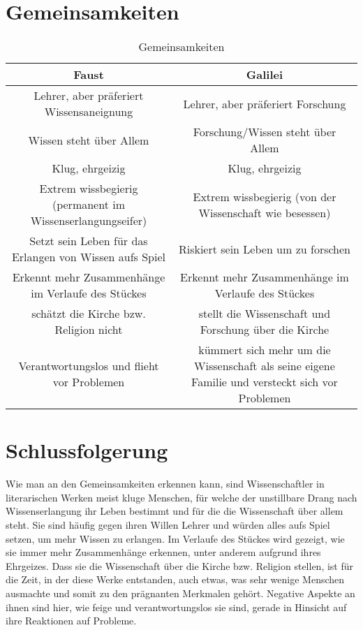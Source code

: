 \documentclass[12pt]{scrreprt}
\begin{document}
\section{Gemeinsamkeiten}
	\label{sec:gemeinsamkeiten}
	\begin{table}[!htb]
		\centering
		\caption[Gemeinsamkeiten]{Gemeinsamkeiten\footnotemark}
		\begin{tabulary}{\textwidth}{|C|C|}
			\hline
			\textbf{Faust} & \textbf{Galilei} \\
			\hline
			Lehrer, aber präferiert Wissensaneignung & Lehrer, aber präferiert Forschung \\
			\hline
			Wissen steht über Allem & Forschung/Wissen steht über Allem \\
			\hline
			Klug, ehrgeizig & Klug, ehrgeizig  \\
			\hline
			Extrem wissbegierig (permanent im Wissenserlangungseifer) & Extrem wissbegierig (von der Wissenschaft wie besessen) \\
			\hline
			Setzt sein Leben für das Erlangen von Wissen aufs Spiel & Riskiert sein Leben um zu forschen  \\
			\hline
			Erkennt mehr Zusammenhänge im Verlaufe des Stückes & Erkennt mehr Zusammenhänge im Verlaufe des Stückes  \\
			\hline
			schätzt die Kirche bzw. Religion nicht & stellt die Wissenschaft und Forschung über die Kirche  \\
			\hline
			Verantwortungslos und flieht vor Problemen & kümmert sich mehr um die Wissenschaft als seine eigene Familie und versteckt sich vor Problemen \\
			\hline
		\end{tabulary}
		\label{tab:gemeinsamkeiten}
	\end{table}
\section{Schlussfolgerung}
	\label{sec:schlussfolgerung}
Wie man an den Gemeinsamkeiten erkennen kann, sind Wissenschaftler in literarischen Werken meist kluge Menschen, für welche der unstillbare Drang nach Wissenserlangung ihr Leben bestimmt und für die die Wissenschaft über allem steht.
Sie sind häufig gegen ihren Willen Lehrer und würden alles aufs Spiel setzen, um mehr Wissen zu erlangen.
Im Verlaufe des Stückes wird gezeigt, wie sie immer mehr Zusammenhänge erkennen, unter anderem aufgrund ihres Ehrgeizes.
Dass sie die Wissenschaft über die Kirche bzw. Religion stellen, ist für die Zeit, in der diese Werke entstanden, auch etwas, was sehr wenige Menschen ausmachte und somit zu den prägnanten Merkmalen gehört.
Negative Aspekte an ihnen sind hier, wie feige und verantwortungslos sie sind, gerade in Hinsicht auf ihre Reaktionen auf Probleme.
\end{document}
